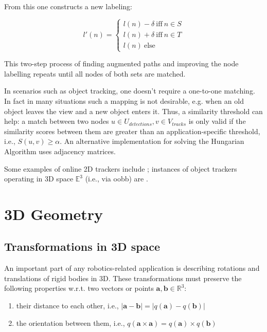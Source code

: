 \documentclass[headsepline, hidelinks, footsepline, footinclude=false, oneside, fontsize=11pt, paper=a4, listof=totoc, bibliography=totoc]{scrbook}
\begin{document}
From this one constructs a new labeling:

\begin{equation}
l'(n) = 
\begin{cases}
l(n) - \delta ~\text{iff}~ n \in S \\
l(n) + \delta ~\text{iff}~ n \in T \\
l(n) ~\text{else}~
\end{cases}
\end{equation}

This two-step process of finding augmented paths and improving the node labelling repeats until all nodes of both sets are matched.

In scenarios such as object tracking, one doesn't require a one-to-one matching. In fact in many situations such a mapping is not desirable, e.g. when an old object leaves the view and a new object enters it.
Thus, a similarity threshold can help: a match between two nodes \(u \in U_{detections}, v \in V_{tracks}\) is only valid if the similarity scores between them are greater than an application-specific threshold, i.e., \(S(u, v) \geq \alpha\). 
An alternative implementation for solving the Hungarian Algorithm uses adjacency matrices.

Some examples of online 2D trackers include \cite{voigtlaenderMOTSMultiObjectTracking2019,bewleySimpleOnlineRealtime2016};
instances of object trackers operating in 3D space \(\mathbb{E}^3\) (i.e., via \gls{oobb}) are \cite{wengBaseline3DMultiObject2019,osepCombinedImageWorldSpace2018}.


\section{3D Geometry \label{3d-geometry}}
\label{sec:org85187ac}
\subsection{Transformations in 3D space \label{transformations-3d}}
\label{sec:org8db448f}
   An important part of any robotics-related application is describing rotations and translations of rigid bodies in 3D.
These transformations must preserve the following properties \cite{bottemaTheoreticalKinematics1990} w.r.t. two vectors or points \(\mathbf{a}, \mathbf{b} \in \mathbb{R}^3\):

\begin{enumerate}
\item their distance to each other, i.e., \(|\mathbf{a} - \mathbf{b}| = |q(\mathbf{a}) - q(\mathbf{b})|\)
\item the orientation between them, i.e., \(q(\mathbf{a} \times \mathbf{a}) = q(\mathbf{a}) \times q(\mathbf{b})\)
\end{enumerate}
\end{document}
